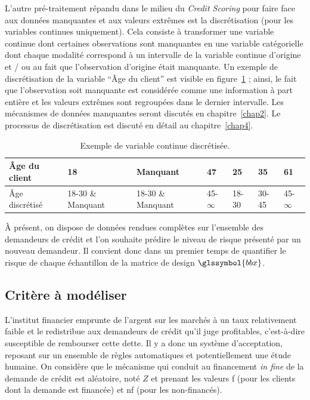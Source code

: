 L'autre pré-traitement répandu dans le milieu du \textit{Credit Scoring} pour faire face aux données manquantes et aux valeurs extrêmes est la discrétisation (pour les variables continues uniquement). Cela consiste à transformer une variable continue dont certaines observations sont manquantes en une variable catégorielle dont chaque modalité correspond à un intervalle de la variable continue d'origine et / ou au fait que l'observation d'origine était manquante. Un exemple de discrétisation de la variable ``Âge du client'' est visible en figure~\ref{tab:disc_ex} ; ainsi, le fait que l'observation soit manquante est considérée comme une information à part entière et les valeurs extrêmes sont regroupées dans le dernier intervalle. Les mécanismes de données manquantes seront discutés en chapitre~\ref{chap2}. Le processus de discrétisation est discuté en détail au chapitre~\ref{chap4}.

\begin{table}
\centering
\caption{\label{tab:disc_ex} Exemple de variable continue discrétisée.}
\begin{tabular}{l|l|l|l|l|l|l}
Âge du client & 18 & Manquant & 47 & 25 & 35 & 61 \\
\hline
Âge discrétisé & 18-30 \& Manquant & 18-30 \& Manquant & 45-$\infty$ & 18-30 & 30-45 & 45-$\infty$ \\
\end{tabular}
\end{table}

\`A présent, on dispose de données rendues complètes sur l'ensemble des demandeurs de crédit et l'on souhaite prédire le niveau de risque présenté par un nouveau demandeur. Il convient donc dans un premier temps de quantifier le risque de chaque échantillon de la matrice de design $\glssymbol{bbx}$.

\subsection{Critère à modéliser} \label{subsec:critere}

L'institut financier emprunte de l'argent sur les marchés à un taux relativement faible et le redistribue aux demandeurs de crédit qu'il juge profitables, c'est-à-dire susceptible de rembourser cette dette. Il y a donc un système d'acceptation, reposant sur un ensemble de règles automatiques et potentiellement une étude humaine. On considère que le mécanisme qui conduit au financement \textit{in fine} de la demande de crédit est aléatoire, noté $Z$ et prenant les valeurs f (pour les clients dont la demande est financée) et nf (pour les non-financés).

